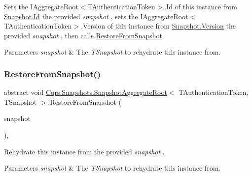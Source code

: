 Sets the I\+Aggregate\+Root$<$\+T\+Authentication\+Token$>$.\+Id of this instance from \hyperlink{classCqrs_1_1Snapshots_1_1Snapshot_a0da54bdfa43e46a17f6e6aa88d1f3b67_a0da54bdfa43e46a17f6e6aa88d1f3b67}{Snapshot.\+Id} the provided {\itshape snapshot} , sets the I\+Aggregate\+Root$<$\+T\+Authentication\+Token$>$.\+Version of this instance from \hyperlink{classCqrs_1_1Snapshots_1_1Snapshot_a59c0a399430e5f4a1b27d999c3bb5d4f_a59c0a399430e5f4a1b27d999c3bb5d4f}{Snapshot.\+Version} the provided {\itshape snapshot} , then calls \hyperlink{classCqrs_1_1Snapshots_1_1SnapshotAggregateRoot_aefe31de169e33147439a69017a4fd3f7_aefe31de169e33147439a69017a4fd3f7}{Restore\+From\+Snapshot} 


\begin{DoxyParams}{Parameters}
{\em snapshot} & The {\itshape T\+Snapshot}  to rehydrate this instance from.\\
\hline
\end{DoxyParams}
\mbox{\label{classCqrs_1_1Snapshots_1_1SnapshotAggregateRoot_aefe31de169e33147439a69017a4fd3f7_aefe31de169e33147439a69017a4fd3f7}} 
\subsubsection{\texorpdfstring{Restore\+From\+Snapshot()}{RestoreFromSnapshot()}}
{\footnotesize\ttfamily abstract void \hyperlink{classCqrs_1_1Snapshots_1_1SnapshotAggregateRoot}{Cqrs.\+Snapshots.\+Snapshot\+Aggregate\+Root}$<$ T\+Authentication\+Token, T\+Snapshot $>$.Restore\+From\+Snapshot (\begin{DoxyParamCaption}\item[{T\+Snapshot}]{snapshot }\end{DoxyParamCaption})\hspace{0.3cm}{\ttfamily [protected]}, {}}



Rehydrate this instance from the provided {\itshape snapshot} . 


\begin{DoxyParams}{Parameters}
{\em snapshot} & The {\itshape T\+Snapshot}  to rehydrate this instance from.\\
\hline
\end{DoxyParams}
